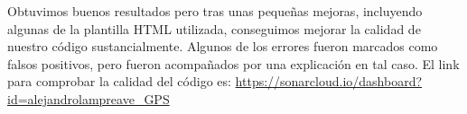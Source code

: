 Obtuvimos buenos resultados pero tras unas pequeñas mejoras, incluyendo algunas de la plantilla HTML utilizada, conseguimos mejorar la calidad de nuestro código sustancialmente. Algunos de los errores fueron marcados como falsos positivos, pero fueron acompañados por una explicación en tal caso. El link para comprobar la calidad del código es: \url{https://sonarcloud.io/dashboard?id=alejandrolampreave_GPS}



